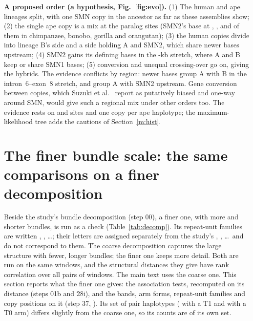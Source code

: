 \textbf{A proposed order (a hypothesis, Fig.~\ref{fig:evo}).} (1) The human and ape lineages split, with one SMN copy
in the ancestor as far as these assemblies show; (2) the single ape copy is a mix at the paralog sites (SMN2's base at
\evTwoBaseChimp, \evTwoBaseBonobo, \evTwoBaseGorilla{} and \evTwoBaseOrang{} of them in chimpanzee, bonobo, gorilla
and orangutan); (3) the human copies divide into lineage B's side and a side holding A and SMN2, which share newer bases
upstream; (4) SMN2 gains its defining bases in the \evSspanKb-kb stretch, where A and B keep or share SMN1 bases; (5)
conversion and unequal crossing-over go on, giving the hybrids. The evidence conflicts by region: \evSsharedAB{} newer
bases group A with B in the intron~6--exon~8 stretch, and \evABsharedATwo{} group A with SMN2 upstream. Gene conversion
between copies, which Suzuki et al.~\cite{suzuki2026} report as putatively biased and one-way around
SMN, would give such a regional mix under other orders too. The evidence rests on \evS{} and \evAB{} sites and one copy
per ape haplotype; the maximum-likelihood tree adds the cautions of Section~\ref{m:hist}.




\section{The finer bundle scale: the same comparisons on a finer decomposition}\label{sec:fine}
Beside the study's bundle decomposition (step 00), a finer one, with more and shorter bundles, is run as a check (Table~\ref{tab:decomp}). Its repeat-unit families are written , , \dots; their letters are assigned separately from the study's , , \dots\ and do not correspond to them. The coarse
decomposition captures the large structure with fewer, longer bundles; the finer one keeps more detail. Both are run on
the same \wfN{} windows, and the structural distances they give have rank correlation \tsStructRho{} over all pairs of
windows. The main text uses the coarse one. This section reports what the finer one gives: the association tests,
recomputed on its distance (steps 01b and 28i), and the bands, arm forms, repeat-unit families and copy positions on it (step 37,
). Its set of
pair haplotypes (\fafTOneAll{} with a T1 and \fafTZeroAll{} with a T0 arm) differs slightly from the coarse one, so its counts are of its own set.

